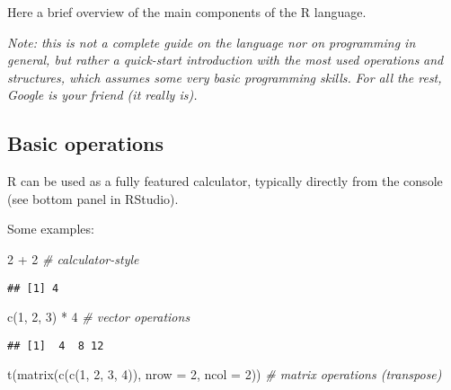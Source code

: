 \documentclass[
  oneside]{book}
\newenvironment{Shaded}{\begin{snugshade}}{\end{snugshade}}
\newcommand{\AttributeTok}[1]{\textcolor[rgb]{0.77,0.63,0.00}{#1}}
\newcommand{\CommentTok}[1]{\textcolor[rgb]{0.56,0.35,0.01}{\textit{#1}}}
\newcommand{\DecValTok}[1]{\textcolor[rgb]{0.00,0.00,0.81}{#1}}
\newcommand{\FunctionTok}[1]{\textcolor[rgb]{0.00,0.00,0.00}{#1}}
\newcommand{\NormalTok}[1]{#1}
\newcommand{\SpecialCharTok}[1]{\textcolor[rgb]{0.00,0.00,0.00}{#1}}
\begin{document}
Here a brief overview of the main components of the R language.

\emph{Note: this is not a complete guide on the language nor on programming in}
\emph{general, but rather a quick-start introduction with the most used operations}
\emph{and structures, which assumes some very basic programming skills.}
\emph{For all the rest, Google is your friend (it really is).}

\hypertarget{basic-operations}{%
\subsection{Basic operations}\label{basic-operations}}

R can be used as a fully featured calculator, typically directly
from the console (see bottom panel in RStudio).

Some examples:

\begin{Shaded}
\begin{Highlighting}[]
\DecValTok{2} \SpecialCharTok{+} \DecValTok{2} \CommentTok{\# calculator{-}style}
\end{Highlighting}
\end{Shaded}

\begin{verbatim}
## [1] 4
\end{verbatim}

\begin{Shaded}
\begin{Highlighting}[]
\FunctionTok{c}\NormalTok{(}\DecValTok{1}\NormalTok{, }\DecValTok{2}\NormalTok{, }\DecValTok{3}\NormalTok{) }\SpecialCharTok{*} \DecValTok{4} \CommentTok{\# vector operations}
\end{Highlighting}
\end{Shaded}

\begin{verbatim}
## [1]  4  8 12
\end{verbatim}

\begin{Shaded}
\begin{Highlighting}[]
\FunctionTok{t}\NormalTok{(}\FunctionTok{matrix}\NormalTok{(}\FunctionTok{c}\NormalTok{(}\FunctionTok{c}\NormalTok{(}\DecValTok{1}\NormalTok{, }\DecValTok{2}\NormalTok{, }\DecValTok{3}\NormalTok{, }\DecValTok{4}\NormalTok{)),}
         \AttributeTok{nrow =} \DecValTok{2}\NormalTok{, }\AttributeTok{ncol =} \DecValTok{2}\NormalTok{)) }\CommentTok{\# matrix operations (transpose)}
\end{Highlighting}
\end{Shaded}
\end{document}
